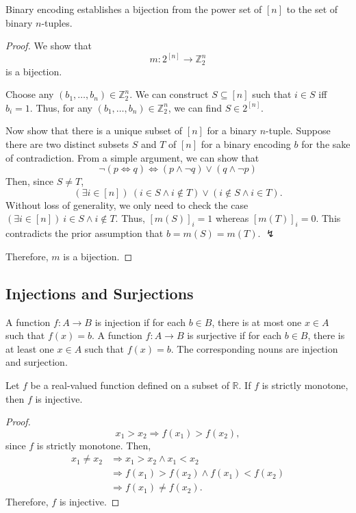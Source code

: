 \documentclass[../main.tex]{subfiles}
\begin{document}
\begin{prop}
    Binary encoding establishes a bijection from the power set of $[n]$ to the set of binary $n$-tuples.
\end{prop}
\begin{proof}
    We show that
    \[
        m: 2^{[n]} \rightarrow \mathbb{Z}_2^n
    \]
    is a bijection.

    Choose any $(b_1, \dots, b_n) \in \mathbb{Z}_2^n$.
    We can construct $S \subseteq [n]$ such that $i \in S$ iff $b_i = 1$.
    Thus, for any $(b_1, \dots, b_n) \in \mathbb{Z}_2^n$, we can find $S \in 2^{[n]}$.

    Now show that there is a unique subset of $[n]$ for a binary $n$-tuple.
    Suppose there are two distinct subsets $S$ and $T$ of $[n]$ for a binary encoding $b$ for the sake of contradiction.
    From a simple argument, we can show that
    \[
        \neg (p \Leftrightarrow q) \Leftrightarrow (p \wedge \neg q) \vee (q \wedge \neg p)
    \]
    Then, since $S \neq T$,
    \[
        (\exists i \in [n])\ (i \in S \wedge i \notin T) \vee (i \notin S \wedge i \in T).
    \]
    Without loss of generality, we only need to check the case $(\exists i \in [n])\ i \in S \wedge i \notin T$.
    Thus, $[m(S)]_i = 1$ whereas $[m(T)]_i = 0$.
    This contradicts the prior assumption that $b = m(S) = m(T)$. $\lightning$

    Therefore, $m$ is a bijection.
\end{proof}

\subsection{Injections and Surjections}
\begin{defn}
    A function $f: A \rightarrow B$ is \textsf{injection} if for each $b \in B$, there is at most one $x \in A$ such that $f(x) = b$.
    A function $f: A \rightarrow B$ is \textsf{surjective} if for each $b \in B$, there is at least one $x \in A$ such that $f(x) = b$.
    The corresponding nouns are \textsf{injection} and \textsf{surjection}.
\end{defn}

\begin{prop} \label{prop:strictinject}
    Let $f$ be a real-valued function defined on a subset of $\mathbb R$.
    If $f$ is strictly monotone, then $f$ is injective.
\end{prop}
\begin{proof}
    \[
        x_1 > x_2 \Rightarrow f(x_1) > f(x_2),
    \]
    since $f$ is strictly monotone.
    Then,
    \begin{align*}
        x_1 \neq x_2 &\Rightarrow x_1 > x_2 \wedge x_1 < x_2\\
                     &\Rightarrow f(x_1) > f(x_2) \wedge f(x_1) < f(x_2)\\
                     &\Rightarrow f(x_1) \neq f(x_2).
    \end{align*}
    Therefore, $f$ is injective.
\end{proof}
\end{document}
